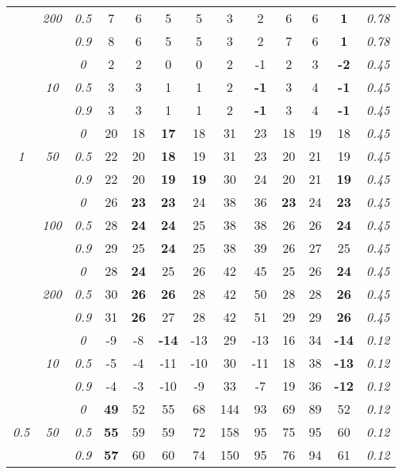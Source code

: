 \begin{table}
\begin{center}
\begin{tabular}{ccc|cc|cc|cc|cc|c|c}
 & \it  200  & \it  0.5  & 7 & 6 & 5 & 5 & 3 & 2 & 6 & 6 & {\bf 1} & \it  0.78 \\
& & \it  0.9  & 8 & 6 & 5 & 5 & 3 & 2 & 7 & 6 & {\bf 1} & \it  0.78 \\
\hline\rule{0pt}{3ex}
& & \it  0  & 2 & 2 & 0 & 0 & 2 & -1 & 2 & 3 & {\bf -2} & \it  0.45 \\
 & \it  10  & \it  0.5  & 3 & 3 & 1 & 1 & 2 & {\bf -1} & 3 & 4 & {\bf -1} & \it  0.45 \\
& & \it  0.9  & 3 & 3 & 1 & 1 & 2 & {\bf -1} & 3 & 4 & {\bf -1} & \it  0.45 \\[1ex]
\cline{2-3}\rule{0pt}{3ex}
& & \it  0  & 20 & 18 & {\bf 17} & 18 & 31 & 23 & 18 & 19 & 18 & \it  0.45 \\
\it  1  & \it  50  & \it  0.5  & 22 & 20 & {\bf 18} & 19 & 31 & 23 & 20 & 21 & 19 & \it  0.45 \\
& & \it  0.9  & 22 & 20 & {\bf 19} & {\bf 19} & 30 & 24 & 20 & 21 & {\bf 19} & \it  0.45 \\[1ex]
\cline{2-3}\rule{0pt}{3ex}
& & \it  0  & 26 & {\bf 23} & {\bf 23} & 24 & 38 & 36 & {\bf 23} & 24 & {\bf 23} & \it  0.45 \\
 & \it  100  & \it  0.5  & 28 & {\bf 24} & {\bf 24} & 25 & 38 & 38 & 26 & 26 & {\bf 24} & \it  0.45 \\
& & \it  0.9  & 29 & 25 & {\bf 24} & 25 & 38 & 39 & 26 & 27 & 25 & \it  0.45 \\[1ex]
\cline{2-3}\rule{0pt}{3ex}
& & \it  0  & 28 & {\bf 24} & 25 & 26 & 42 & 45 & 25 & 26 & {\bf 24} & \it  0.45 \\
 & \it  200  & \it  0.5  & 30 & {\bf 26} & {\bf 26} & 28 & 42 & 50 & 28 & 28 & {\bf 26} & \it  0.45 \\
& & \it  0.9  & 31 & {\bf 26} & 27 & 28 & 42 & 51 & 29 & 29 & {\bf 26} & \it  0.45 \\
\hline\rule{0pt}{3ex}
& & \it  0  & -9 & -8 & {\bf -14} & -13 & 29 & -13 & 16 & 34 & {\bf -14} & \it  0.12 \\
 & \it  10  & \it  0.5  & -5 & -4 & -11 & -10 & 30 & -11 & 18 & 38 & {\bf -13} & \it  0.12 \\
& & \it  0.9  & -4 & -3 & -10 & -9 & 33 & -7 & 19 & 36 & {\bf -12} & \it  0.12 \\[1ex]
\cline{2-3}\rule{0pt}{3ex}
& & \it  0  & {\bf 49} & 52 & 55 & 68 & 144 & 93 & 69 & 89 & 52 & \it  0.12 \\
\it  0.5  & \it  50  & \it  0.5  & {\bf 55} & 59 & 59 & 72 & 158 & 95 & 75 & 95 & 60 & \it  0.12 \\
& & \it  0.9  & {\bf 57} & 60 & 60 & 74 & 150 & 95 & 76 & 94 & 61 & \it  0.12 \\[1ex]

\end{tabular}
\end{center}
\end{table}
